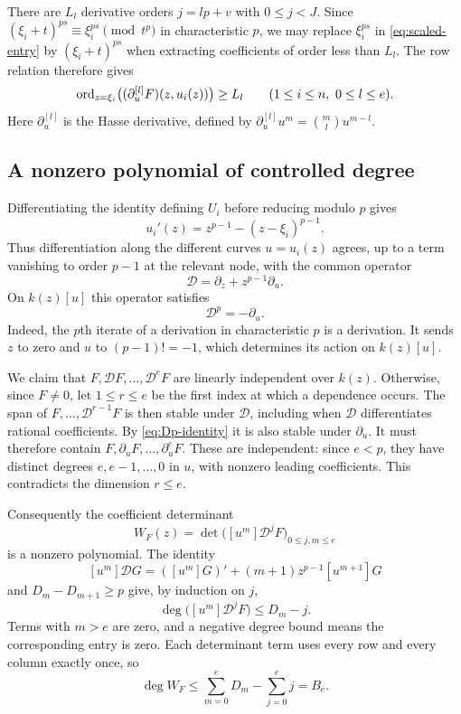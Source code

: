 There are $L_l$ derivative orders $j=lp+v$ with $0\leq j<J$.
Since $(\xi_i+t)^{ps}\equiv\xi_i^{ps}\pmod{t^p}$ in characteristic $p$,
we may replace $\xi_i^{ps}$ in \eqref{eq:scaled-entry} by
$(\xi_i+t)^{ps}$ when extracting coefficients of order less than $L_l$.
The row relation therefore gives
\begin{equation}\label{eq:local-hasse-vanish}
 \operatorname{ord}_{z=\xi_i}\bigl((\partial_u^{[l]}F)(z,u_i(z))\bigr)\geq L_l
 \qquad(1\leq i\leq n,\ 0\leq l\leq e).
\end{equation}
Here $\partial_u^{[l]}$ is the Hasse derivative, defined by
$\partial_u^{[l]}u^m=\binom ml u^{m-l}$.

\subsection{A nonzero polynomial of controlled degree}
Differentiating the identity defining $U_i$ before reducing modulo $p$ gives
\begin{equation}\label{eq:ui-prime}
 u_i'(z)=z^{p-1}-(z-\xi_i)^{p-1}.
\end{equation}
Thus differentiation along the different curves $u=u_i(z)$ agrees, up to
a term vanishing to order $p-1$ at the relevant node, with the common operator
\[
 \mathcal D=\partial_z+z^{p-1}\partial_u.
\]
On $k(z)[u]$ this operator satisfies
\begin{equation}\label{eq:Dp-identity}
 \mathcal D^p=-\partial_u.
\end{equation}
Indeed, the $p$th iterate of a derivation in characteristic $p$ is a
derivation. It sends $z$ to zero and $u$ to $(p-1)!=-1$, which determines
its action on $k(z)[u]$.

We claim that $F,\mathcal DF,\ldots,\mathcal D^eF$ are linearly independent
over $k(z)$. Otherwise, since $F\ne0$, let $1\leq r\leq e$ be the first index at
which a dependence occurs. The span of $F,\ldots,\mathcal D^{r-1}F$ is then stable
under $\mathcal D$, including when $\mathcal D$ differentiates rational
coefficients. By \eqref{eq:Dp-identity} it is also stable under $\partial_u$.
It must therefore contain $F,\partial_uF,\ldots,\partial_u^eF$.
These are independent: since $e<p$, they have distinct degrees
$e,e-1,\ldots,0$ in $u$, with nonzero leading coefficients.
This contradicts the dimension $r\leq e$.

Consequently the coefficient determinant
\begin{equation}\label{eq:WF-def}
 W_F(z)=\det\bigl([u^m]\mathcal D^jF\bigr)_{0\leq j,m\leq e}
\end{equation}
is a nonzero polynomial. The identity
\[
 [u^m]\mathcal DG=([u^m]G)' +(m+1)z^{p-1}[u^{m+1}]G
\]
and $D_m-D_{m+1}\geq p$ give, by induction on $j$,
\[
 \deg\bigl([u^m]\mathcal D^jF\bigr)\leq D_m-j.
\]
Terms with $m>e$ are zero, and a negative degree bound means the
corresponding entry is zero. Each determinant term uses every row and every
column exactly once, so
\begin{equation}\label{eq:WF-degree}
 \deg W_F\leq\sum_{m=0}^eD_m-\sum_{j=0}^ej=B_e.
\end{equation}


